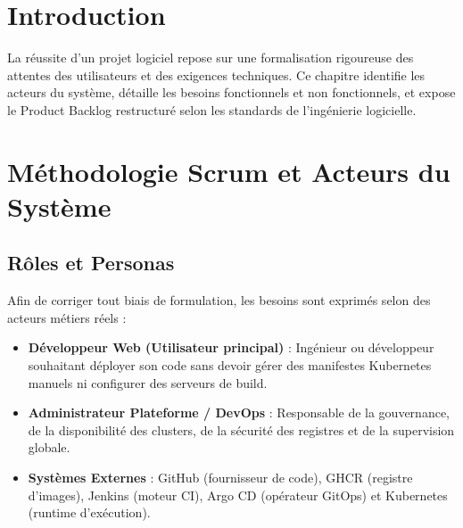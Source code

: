 \documentclass[12pt,a4paper,oneside]{report}
\begin{document}
\section{Introduction}
La réussite d'un projet logiciel repose sur une formalisation rigoureuse des attentes des utilisateurs et des exigences techniques. Ce chapitre identifie les acteurs du système, détaille les besoins fonctionnels et non fonctionnels, et expose le Product Backlog restructuré selon les standards de l'ingénierie logicielle.

\section{Méthodologie Scrum et Acteurs du Système}
\subsection{Rôles et Personas}
Afin de corriger tout biais de formulation, les besoins sont exprimés selon des acteurs métiers réels :
\begin{itemize}[label=$\bullet$]
    \item \textbf{Développeur Web (Utilisateur principal)} : Ingénieur ou développeur souhaitant déployer son code sans devoir gérer des manifestes Kubernetes manuels ni configurer des serveurs de build.
    \item \textbf{Administrateur Plateforme / DevOps} : Responsable de la gouvernance, de la disponibilité des clusters, de la sécurité des registres et de la supervision globale.
    \item \textbf{Systèmes Externes} : GitHub (fournisseur de code), GHCR (registre d'images), Jenkins (moteur CI), Argo CD (opérateur GitOps) et Kubernetes (runtime d'exécution).
\end{itemize}
\end{document}
